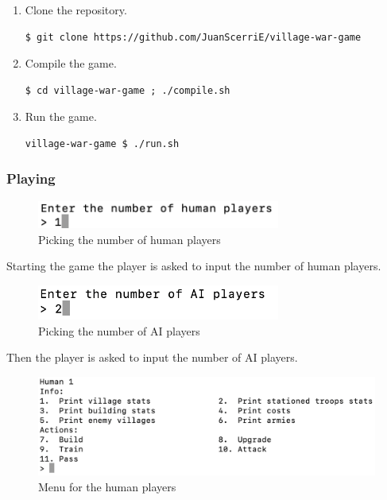 \documentclass[12pt]{article}
\begin{document}
\begin{enumerate}
\item
    Clone the repository.
\begin{lstlisting}
$ git clone https://github.com/JuanScerriE/village-war-game
\end{lstlisting}

\item
    Compile the game.
\begin{lstlisting}
$ cd village-war-game ; ./compile.sh
\end{lstlisting}

\item
    Run the game.
\begin{lstlisting}
village-war-game $ ./run.sh
\end{lstlisting}

\end{enumerate}

\subsubsection{Playing}

\begin{figure}[H]
    \centering
    \includegraphics[width=8cm]{./images/human-players-village-war-game.png}
    \caption{Picking the number of human players}
    \label{human-players-village-war-game}
\end{figure}

Starting the game the player is asked to input the number of
human players.

\begin{figure}[H]
    \centering
    \includegraphics[width=8cm]{./images/ai-players-village-war-game.png}
    \caption{Picking the number of AI players}
    \label{ai-players-village-war-game}
\end{figure}

Then the player is asked to input the number of AI players.

\begin{figure}[H]
    \centering
    \includegraphics[width=12cm]{./images/player-menu-village-war-game.png}
    \caption{Menu for the human players}
    \label{player-menu-village-war-game}
\end{figure}
\end{document}
